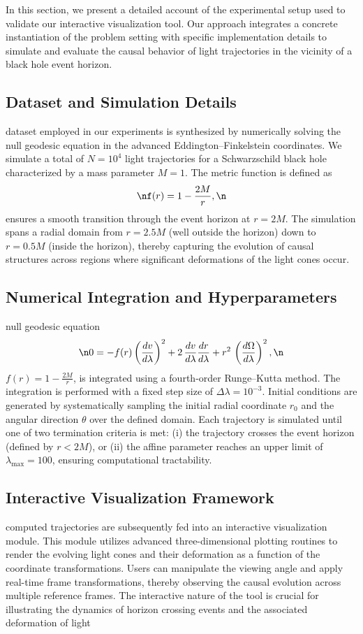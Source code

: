 \documentclass{article}
\begin{document}
In this section, we present a detailed account of the experimental setup used to validate our interactive visualization tool. Our approach integrates a concrete instantiation of the problem setting with specific implementation details to simulate and evaluate the causal behavior of light trajectories in the vicinity of a black hole event horizon.\n\n\subsection{Dataset and Simulation Details}\nThe dataset employed in our experiments is synthesized by numerically solving the null geodesic equation in the advanced Eddington--Finkelstein coordinates. We simulate a total of $N=10^4$ light trajectories for a Schwarzschild black hole characterized by a mass parameter $M=1$. The metric function is defined as\n\begin{equation}\nf(r)=1-\frac{2M}{r},\n\end{equation}\nwhich ensures a smooth transition through the event horizon at $r=2M$. The simulation spans a radial domain from $r=2.5M$ (well outside the horizon) down to $r=0.5M$ (inside the horizon), thereby capturing the evolution of causal structures across regions where significant deformations of the light cones occur.\n\n\subsection{Numerical Integration and Hyperparameters}\nThe null geodesic equation\n\begin{equation}\n0 = -f(r)\left(\frac{dv}{d\lambda}\right)^2 + 2\,\frac{dv}{d\lambda}\frac{dr}{d\lambda} + r^2\,\left(\frac{d\Omega}{d\lambda}\right)^2,\n\end{equation}\nwith $f(r)=1-\frac{2M}{r}$, is integrated using a fourth-order Runge--Kutta method. The integration is performed with a fixed step size of $\Delta \lambda=10^{-3}$. Initial conditions are generated by systematically sampling the initial radial coordinate $r_0$ and the angular direction $\theta$ over the defined domain. Each trajectory is simulated until one of two termination criteria is met: (i) the trajectory crosses the event horizon (defined by $r<2M$), or (ii) the affine parameter reaches an upper limit of $\lambda_{\max}=100$, ensuring computational tractability.\n\n\subsection{Interactive Visualization Framework}\nThe computed trajectories are subsequently fed into an interactive visualization module. This module utilizes advanced three-dimensional plotting routines to render the evolving light cones and their deformation as a function of the coordinate transformations. Users can manipulate the viewing angle and apply real-time frame transformations, thereby observing the causal evolution across multiple reference frames. The interactive nature of the tool is crucial for illustrating the dynamics of horizon crossing events and the associated deformation of light 
\end{document}
